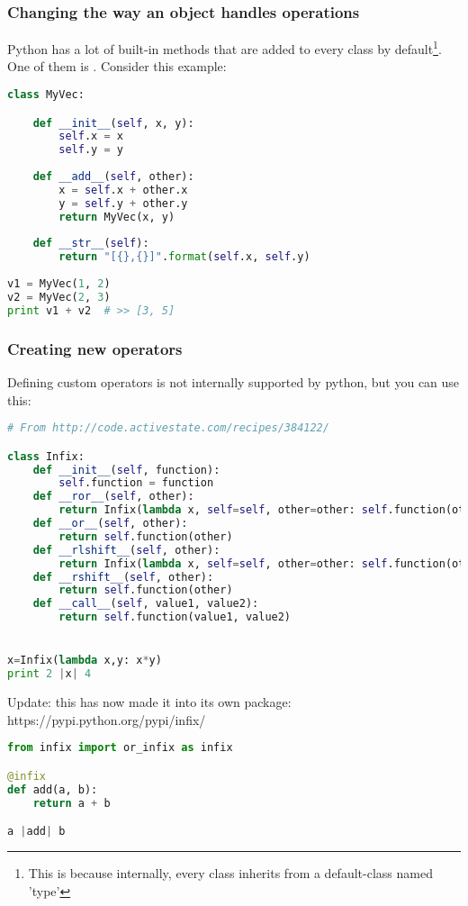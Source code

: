 \subsubsection{Changing the way an object handles operations}

Python has a lot of built-in methods that are added to every class by default\footnote{This is because internally, every class inherits from a default-class named 'type'}. One of them is .
Consider this example: 

\begin{lstlisting}[language=python]
class MyVec:

	def __init__(self, x, y):
		self.x = x
		self.y = y
		
	def __add__(self, other):
		x = self.x + other.x
		y = self.y + other.y
		return MyVec(x, y)
		
	def __str__(self):
		return "[{},{}]".format(self.x, self.y)
		
v1 = MyVec(1, 2)
v2 = MyVec(2, 3)
print v1 + v2  # >> [3, 5]
\end{lstlisting}


\subsubsection{Creating new operators}

Defining custom operators is not internally supported by python, but you can use this: 

\begin{lstlisting}[language=python]
# From http://code.activestate.com/recipes/384122/

class Infix:
    def __init__(self, function):
        self.function = function
    def __ror__(self, other):
        return Infix(lambda x, self=self, other=other: self.function(other, x))
    def __or__(self, other):
        return self.function(other)
    def __rlshift__(self, other):
        return Infix(lambda x, self=self, other=other: self.function(other, x))
    def __rshift__(self, other):
        return self.function(other)
    def __call__(self, value1, value2):
        return self.function(value1, value2)


x=Infix(lambda x,y: x*y)
print 2 |x| 4
\end{lstlisting}

Update: this has now made it into its own package: https://pypi.python.org/pypi/infix/

\begin{lstlisting}[language=python]
from infix import or_infix as infix

@infix
def add(a, b):
    return a + b

a |add| b
\end{lstlisting}


